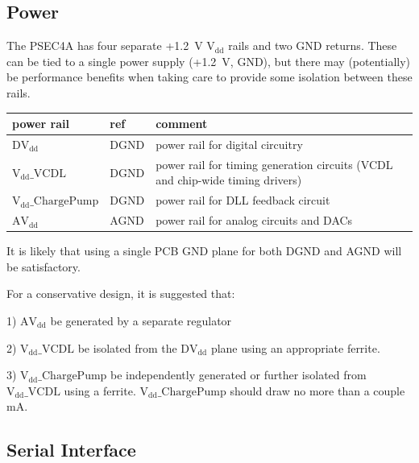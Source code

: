 \documentclass[12pt]{article}
\begin{document}
\subsection*{Power}
The PSEC4A has four separate +1.2~V $\mathrm{V_{dd}}$ rails and two GND returns.
These can be tied to a single power supply (+1.2~V, GND), but there may (potentially) be
performance benefits when taking care to provide some isolation between these rails. 

\begin{center}
\begin{tabular}[h!]{l|l|p{10cm}}
  \hline
   power rail       & ref &  comment \\ \hline
   $\mathrm{DV_{dd}}$ &  DGND  &  power rail for digital circuitry  \\ \hline
   $\mathrm{V_{dd}\_VCDL}$ &  DGND  &  power rail for timing generation circuits (VCDL and chip-wide timing drivers) \\ \hline
   $\mathrm{V_{dd}\_ChargePump}$ &  DGND  &  power rail for DLL feedback circuit \\ \hline
   $\mathrm{AV_{dd}}$ &  AGND  &  power rail for analog circuits and DACs \\ \hline

\end{tabular}
\end{center}

It is likely that using a single PCB GND plane for both DGND and AGND will be satisfactory.

For a conservative design, it is suggested that: 

1) $\mathrm{AV_{dd}}$ be generated by a separate regulator

2) $\mathrm{V_{dd}\_VCDL}$ be isolated from the $\mathrm{DV_{dd}}$ plane using an appropriate ferrite.

3) $\mathrm{V_{dd}\_ChargePump}$ be independently generated or further isolated from  $\mathrm{V_{dd}\_VCDL}$ using a ferrite.
$\mathrm{V_{dd}\_ChargePump}$ should draw no more than a couple mA.

\subsection*{Serial Interface}
\end{document}
